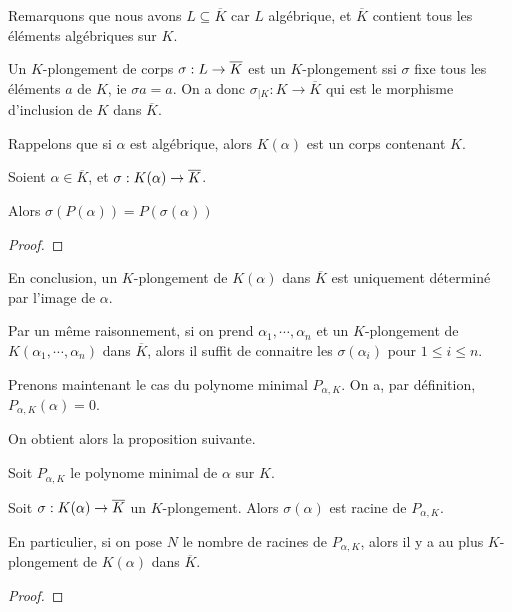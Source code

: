Remarquons que nous avons $L \subseteq \overline{K}$ car $L$ algébrique, et
$\overline{K}$ contient tous les éléments algébriques sur $K$.

Un $K$-plongement de corps $\sigma : L \rightarrow \overline{K}$ est un
$K$-plongement ssi $\sigma$ fixe tous les éléments $a$ de $K$, ie $\sigma{a} =
a$.
On a donc $\sigma_{|K} : K \rightarrow \overline{K}$ qui est le morphisme
d'inclusion de $K$ dans $\overline{K}$.

Rappelons que si $\alpha$ est algébrique, alors $K(\alpha)$ est un corps
contenant $K$.

\begin{proposition}
	Soient $\alpha \in \overline{K}$, et
	$\sigma : K(\alpha) \rightarrow \overline{K}$.

	Alors $\sigma(P(\alpha)) = P(\sigma(\alpha))$
\end{proposition}

\ifdefined\outputproof
\begin{proof}

\end{proof}
\fi

En conclusion, un $K$-plongement de $K(\alpha)$ dans $\overline{K}$ est
uniquement déterminé par l'image de $\alpha$.

Par un même raisonnement, si on prend $\alpha_{1}, \cdots, \alpha_{n}$ et un
$K$-plongement de $K(\alpha_{1}, \cdots, \alpha_{n})$ dans $\overline{K}$, alors
il suffit de connaitre les $\sigma(\alpha_{i})$ pour $1 \leq i \leq n$.

Prenons maintenant le cas du polynome minimal $P_{\alpha, K}$.
On a, par définition, $P_{\alpha, K}(\alpha) = 0$.

On obtient alors la proposition suivante.

\begin{proposition}
	Soit $P_{\alpha, K}$ le polynome minimal de $\alpha$ sur $K$.

	Soit $\sigma : K(\alpha) \rightarrow \overline{K}$ un $K$-plongement. Alors
	$\sigma(\alpha)$ est racine de $P_{\alpha, K}$.

	En particulier, si on pose $N$ le nombre de racines de $P_{\alpha, K}$,
	alors il y a au plus $K$-plongement de $K(\alpha)$ dans $\overline{K}$.
\end{proposition}

\ifdefined\outputproof
\begin{proof}

\end{proof}
\fi

